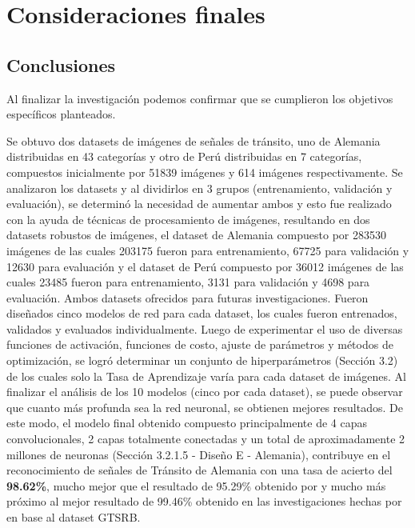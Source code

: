\chapter{Consideraciones finales}
\setcounter{page}{129}
\renewcommand{\baselinestretch}{2} %
\textheight 21cm

\section{Conclusiones}

	Al finalizar la investigación podemos confirmar que se cumplieron los objetivos específicos planteados.

	Se obtuvo dos datasets de imágenes de señales de tránsito, uno de Alemania distribuidas en 43 categorías y otro de Perú distribuidas en 7 categorías, compuestos inicialmente por 51839 imágenes y 614 imágenes respectivamente.
\vskip 0.2cm
	Se analizaron los datasets y al dividirlos en 3 grupos (entrenamiento, validación y evaluación), se determinó la necesidad de aumentar ambos y esto fue realizado con la ayuda de técnicas de procesamiento de imágenes, resultando en dos datasets robustos de imágenes, el dataset de Alemania compuesto por 283530 imágenes de las cuales 203175 fueron para entrenamiento, 67725 para validación y 12630 para evaluación y el dataset de Perú compuesto por 36012 imágenes de las cuales 23485 fueron para entrenamiento, 3131 para validación y 4698 para evaluación. Ambos datasets ofrecidos para futuras investigaciones.
\vskip 0.2cm
	Fueron diseñados cinco modelos de red para cada dataset, los cuales fueron entrenados, validados y evaluados individualmente.
\vskip 0.2cm
	Luego de experimentar el uso de diversas funciones de activación, funciones de costo, ajuste de parámetros y métodos de optimización, se logró determinar un conjunto de hiperparámetros (Sección 3.2) de los cuales solo la Tasa de Aprendizaje varía para cada dataset de imágenes. 
	\vskip 0.2cm
	Al finalizar el análisis de los 10 modelos (cinco por cada dataset), se puede observar que cuanto más profunda sea la red neuronal, se obtienen mejores resultados. 
\vskip 0.2cm
	De este modo, el modelo final obtenido compuesto principalmente de 4 capas convolucionales, 2 capas totalmente conectadas y un total de aproximadamente 2 millones de neuronas (Sección 3.2.1.5 - Diseño E - Alemania), contribuye en el reconocimiento de señales de Tránsito de Alemania con una tasa de acierto del {\bf 98.62\%}, mucho mejor que el resultado de 95.29\% obtenido por \cite{Ayuque2016} y mucho más próximo al mejor resultado de 99.46\% obtenido en las investigaciones hechas por \cite{Ciresan} en base al dataset GTSRB.
	\vskip 0.2cm
	
